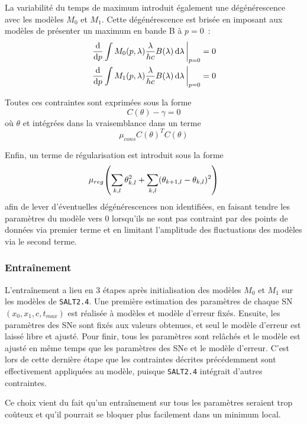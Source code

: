\documentclass{book}
\def\saltd{\texttt{SALT2.4}\xspace}
\begin{document}
La variabilité du temps de maximum introduit également une dégénérescence avec les modèles $M_0$ et $M_1$. Cette dégénérescence est brisée en imposant aux modèles de présenter un maximum en bande B à $p=0$~:
\begin{gather}
	\eval{\dv{p} \int M_0(p,\lambda) \frac{\lambda}{hc} B(\lambda) \dd{\lambda}}_{p=0} = 0\\
	\eval{\dv{p} \int M_1(p,\lambda) \frac{\lambda}{hc} B(\lambda) \dd{\lambda}}_{p=0} = 0
\end{gather}

Toutes ces contraintes sont exprimées sous la forme
\begin{equation}
	C(\theta) - \gamma = 0
\end{equation}
où $\theta$ et intégrées dans la vraisemblance dans un terme
\begin{equation}
	\mu_{cons} C(\theta)^T C(\theta)
\end{equation}

Enfin, un terme de régularisation est introduit sous la forme
\begin{equation}
	\mu_{reg} \qty(\sum_{k,l} \theta^2_{k,l} + \sum_{k,l} (\theta_{k+1, l} - \theta_{k,l})^2)
\end{equation}
afin de lever d'éventuelles dégénérescences non identifiées, en faisant tendre les paramètres du modèle vers 0 lorsqu'ils ne sont pas contraint par des points de données via premier terme et en limitant l'amplitude des fluctuations des modèles via le second terme.


 \subsubsection{Entraînement}

L'entraînement a lieu en 3 étapes après initialisation des modèles $M_0$ et $M_1$ sur les modèles de \saltd. Une première estimation des paramètres de chaque SN $(x_0, x_1, c, t_{max})$ est réalisée à modèles et modèle d'erreur fixés. Ensuite, les paramètres des SNe sont fixés aux valeurs obtenues, et seul le modèle d'erreur est laissé libre et ajusté. Pour finir, tous les paramètres sont relâchés et le modèle est ajusté en même temps que les paramètres des SNe et le modèle d'erreur. C'est lors de cette dernière étape que les contraintes décrites précédemment sont effectivement appliquées au modèle, puisque \saltd intégrait d'autres contraintes.

Ce choix vient du fait qu'un entraînement sur tous les paramètres seraient trop coûteux et qu'il pourrait se bloquer plus facilement dans un minimum local.
\end{document}
